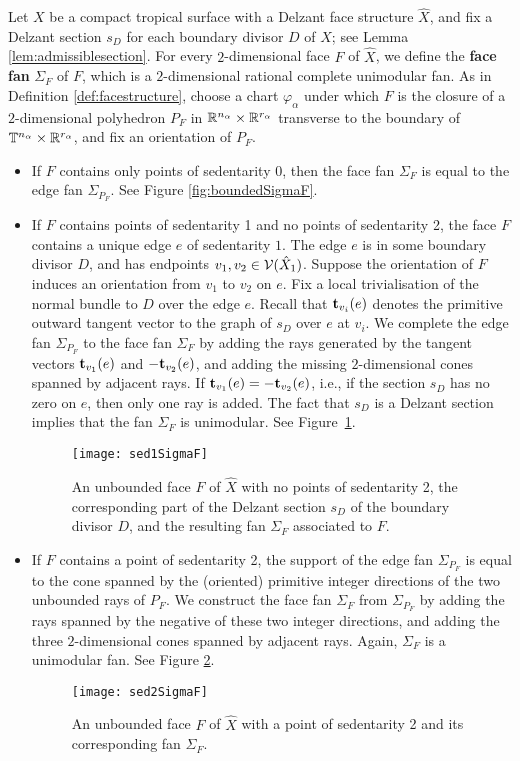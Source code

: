 \begin{defi}\label{def:facefan}
Let $X$ be a compact tropical surface with a Delzant face structure $\hat{X}$, 
and fix a Delzant  section $s_D$ for each boundary divisor $D$ of $X$; see Lemma \ref{lem:admissiblesection}. 
For every $2$-dimensional face $F$ of $\hat{X}$, we define the {\bf face fan} $\Sigma_F$ of $F$,
which is a $2$-dimensional rational complete unimodular fan. As in Definition \ref{def:facestructure}, choose a chart $\varphi_\alpha$ under which $F$ is the closure of a $2$-dimensional polyhedron $P_F$ in $\mathbb{R}^{n_\alpha} \times \mathbb{R}^{r_\alpha}$ transverse to the boundary of $\mathbb{T}^{n_\alpha} \times \mathbb{R}^{r_\alpha}$, and fix an orientation of $P_F$.

\begin{itemize}
\item If $F$ contains only points of sedentarity 0, then the face fan $\Sigma_F$ is equal to the edge fan $\Sigma_{P_F}$. See Figure \ref{fig:boundedSigmaF}.

\item If $F$ contains points of sedentarity 1 and no points of sedentarity 2,  
the face $F$ contains a unique edge $e$ of sedentarity $1$. The edge $e$ is in some boundary divisor $D$, and has endpoints $v_1, v_2 \in {\mathcal V}(\hat X_1)$.  Suppose the orientation of $F$ induces an orientation from $v_1 $ to $v_2$ on $e$. 
Fix a local trivialisation of the normal bundle to $D$ over the edge $e$.
Recall that ${\bf t}_{v_i}(e)$ denotes the primitive outward tangent vector to the graph of $s_D$ over $e$ at $v_i$.
We complete the edge fan $\Sigma_{P_F}$ to the face fan $\Sigma_F$ by adding the rays generated by the 
tangent vectors ${\bf t}_{v_1}(e)$ and $- {\bf t}_{v_2}(e)$, 
and adding the missing $2$-dimensional cones spanned by adjacent rays. 
If ${\bf t}_{v_1}(e) = -{\bf t}_{v_2}(e)$, i.e., if the section
$s_D$ has no zero on $e$, then only one ray is added. 
The fact that $s_D$ is a Delzant section implies that the fan $\Sigma_F$  is unimodular.
See Figure~\ref{fig:sed1SigmaF}.
\begin{figure}
\texttt{[image: sed1SigmaF]} 
\caption{An unbounded face $F$ of $\hat{X}$ with no points of sedentarity 2, the corresponding part of the Delzant section $s_D$ of the boundary divisor $D$, and the resulting fan $\Sigma_F$ associated to $F$. }
\label{fig:sed1SigmaF}
\end{figure}

\item If $F$ contains a point of sedentarity 2, the support of the edge fan ${\Sigma}_{P_F}$ is 
equal to the cone spanned by the (oriented) primitive integer directions of the two unbounded rays of $P_F$.
We construct the face fan $\Sigma_F$ from $\Sigma_{P_F}$ by adding the rays spanned by the negative of these two integer directions, and adding the three $2$-dimensional cones spanned by adjacent rays.
Again, $\Sigma_F$ is a unimodular fan.
See Figure \ref{fig:sed2SigmaF}.
\begin{figure}[b]
\texttt{[image: sed2SigmaF]} 
\caption{An unbounded face $F$ of $\hat{X}$ with a point of sedentarity 2 and its corresponding fan $\Sigma_F$.}
\label{fig:sed2SigmaF}
\end{figure}


\end{itemize}
\end{defi}

